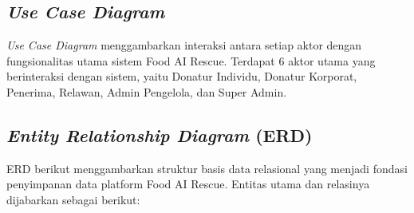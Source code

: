
\subsection{\textit{Use Case Diagram}}

\textit{Use Case Diagram} menggambarkan interaksi antara setiap aktor dengan fungsionalitas utama sistem Food AI Rescue. Terdapat 6 aktor utama yang berinteraksi dengan sistem, yaitu Donatur Individu, Donatur Korporat, Penerima, Relawan, Admin Pengelola, dan Super Admin.

\newpage
\begin{landscape}
\pagestyle{lscape}
    \centering
    \vfill
    
    \captionsetup{hypcap=false}
    \label{fig:use-case}
    \vfill
\end{landscape}
\pagestyle{fancy}
\newpage

\subsection{\textit{Entity Relationship Diagram} (ERD)}
ERD berikut menggambarkan struktur basis data relasional yang menjadi fondasi penyimpanan data platform Food AI Rescue. Entitas utama dan relasinya dijabarkan sebagai berikut:

